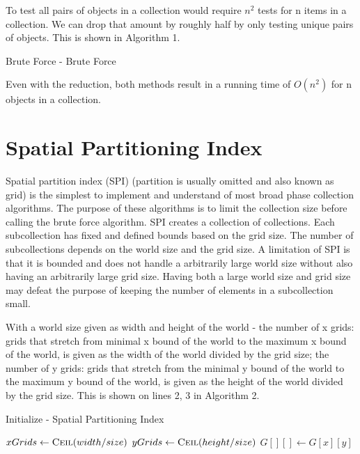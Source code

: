\documentclass[conference]{IEEEtran}
\begin{document}
To test all pairs of objects in a collection would require $n^{2}$ tests for n items in a collection. We can drop that amount by roughly half by only testing unique pairs of objects. This is shown in Algorithm 1.

\begin{algorithm}
\caption{Brute Force - Brute Force}
\begin{algorithmic}[1]
			\State {}
		\EndFor
	\EndFor
\EndFunction
\end{algorithmic}
\end{algorithm}

Even with the reduction, both methods result in a running time of $O(n^{2})$ for n objects in a collection.

\section{Spatial Partitioning Index}

Spatial partition index (SPI) (partition is usually omitted and also known as grid) is the simplest to implement and understand of most broad phase collection algorithms. The purpose of these algorithms is to limit the collection size before calling the brute force algorithm. SPI creates a collection of collections. Each subcollection has fixed and defined bounds based on the grid size. The number of subcollections depends on the world size and the grid size. A limitation of SPI is that it is bounded and does not handle a arbitrarily large world size without also having an arbitrarily large grid size. Having both a large world size and grid size may defeat the purpose of keeping the number of elements in a subcollection small.

With a world size given as width and height of the world - the number of x grids: grids that stretch from minimal x bound of the world to the maximum x bound of the world, is given as the width of the world divided by the grid size; the number of y grids: grids that stretch from the minimal y bound of the world to the maximum y bound of the world, is given as the height of the world divided by the grid size. This is shown on lines 2, 3 in Algorithm 2.

\begin{algorithm}
\caption{Initialize - Spatial Partitioning Index}
\begin{algorithmic}[1]
	\State $xGrids \leftarrow \Call{Ceil}{width / size}$
	\State $yGrids \leftarrow \Call{Ceil}{height / size}$
	\State $G[][] \leftarrow G[x][y]$
\EndFunction
\end{algorithmic}
\end{algorithm}
\end{document}
